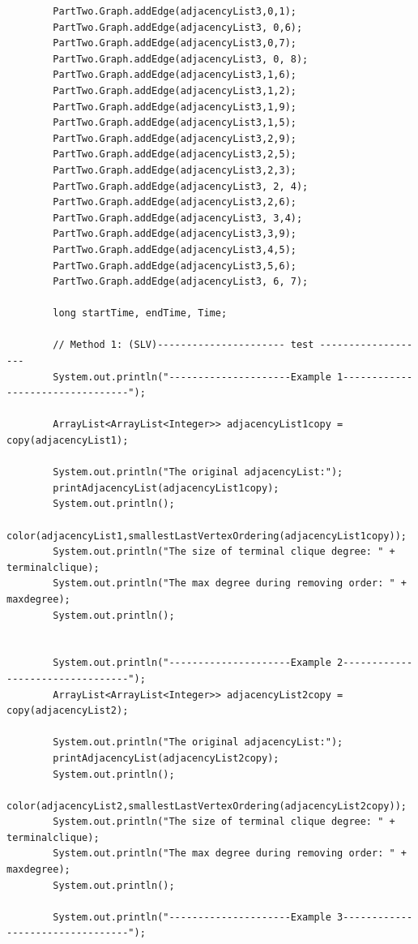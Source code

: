 \documentclass{article}
\begin{document}
\begin{verbatim}
        PartTwo.Graph.addEdge(adjacencyList3,0,1);
        PartTwo.Graph.addEdge(adjacencyList3, 0,6);
        PartTwo.Graph.addEdge(adjacencyList3,0,7);
        PartTwo.Graph.addEdge(adjacencyList3, 0, 8);
        PartTwo.Graph.addEdge(adjacencyList3,1,6);
        PartTwo.Graph.addEdge(adjacencyList3,1,2);
        PartTwo.Graph.addEdge(adjacencyList3,1,9);
        PartTwo.Graph.addEdge(adjacencyList3,1,5);
        PartTwo.Graph.addEdge(adjacencyList3,2,9);
        PartTwo.Graph.addEdge(adjacencyList3,2,5);
        PartTwo.Graph.addEdge(adjacencyList3,2,3);
        PartTwo.Graph.addEdge(adjacencyList3, 2, 4);
        PartTwo.Graph.addEdge(adjacencyList3,2,6);
        PartTwo.Graph.addEdge(adjacencyList3, 3,4);
        PartTwo.Graph.addEdge(adjacencyList3,3,9);
        PartTwo.Graph.addEdge(adjacencyList3,4,5);
        PartTwo.Graph.addEdge(adjacencyList3,5,6);
        PartTwo.Graph.addEdge(adjacencyList3, 6, 7);

        long startTime, endTime, Time;

        // Method 1: (SLV)---------------------- test -------------------
        System.out.println("---------------------Example 1---------------------------------");

        ArrayList<ArrayList<Integer>> adjacencyList1copy = copy(adjacencyList1);

        System.out.println("The original adjacencyList:");
        printAdjacencyList(adjacencyList1copy);
        System.out.println();
        color(adjacencyList1,smallestLastVertexOrdering(adjacencyList1copy));
        System.out.println("The size of terminal clique degree: " + terminalclique);
        System.out.println("The max degree during removing order: " + maxdegree);
        System.out.println();


        System.out.println("---------------------Example 2---------------------------------");
        ArrayList<ArrayList<Integer>> adjacencyList2copy = copy(adjacencyList2);

        System.out.println("The original adjacencyList:");
        printAdjacencyList(adjacencyList2copy);
        System.out.println();
        color(adjacencyList2,smallestLastVertexOrdering(adjacencyList2copy));
        System.out.println("The size of terminal clique degree: " + terminalclique);
        System.out.println("The max degree during removing order: " + maxdegree);
        System.out.println();

        System.out.println("---------------------Example 3---------------------------------");


\end{verbatim}
\end{document}
